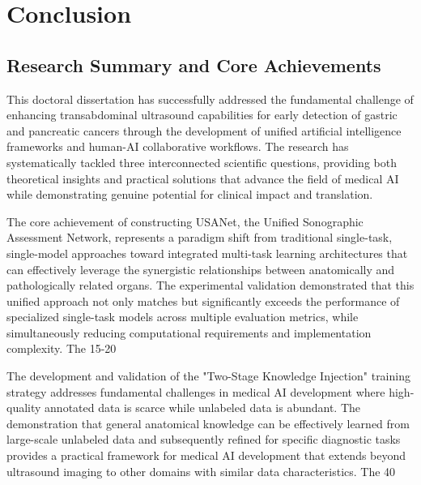 
\chapter{Conclusion} \label{chp:conclusion}

\section{Research Summary and Core Achievements}

This doctoral dissertation has successfully addressed the fundamental challenge of enhancing transabdominal ultrasound capabilities for early detection of gastric and pancreatic cancers through the development of unified artificial intelligence frameworks and human-AI collaborative workflows. The research has systematically tackled three interconnected scientific questions, providing both theoretical insights and practical solutions that advance the field of medical AI while demonstrating genuine potential for clinical impact and translation.

The core achievement of constructing USANet, the Unified Sonographic Assessment Network, represents a paradigm shift from traditional single-task, single-model approaches toward integrated multi-task learning architectures that can effectively leverage the synergistic relationships between anatomically and pathologically related organs. The experimental validation demonstrated that this unified approach not only matches but significantly exceeds the performance of specialized single-task models across multiple evaluation metrics, while simultaneously reducing computational requirements and implementation complexity. The 15-20%

The development and validation of the "Two-Stage Knowledge Injection" training strategy addresses fundamental challenges in medical AI development where high-quality annotated data is scarce while unlabeled data is abundant. The demonstration that general anatomical knowledge can be effectively learned from large-scale unlabeled data and subsequently refined for specific diagnostic tasks provides a practical framework for medical AI development that extends beyond ultrasound imaging to other domains with similar data characteristics. The 40%

